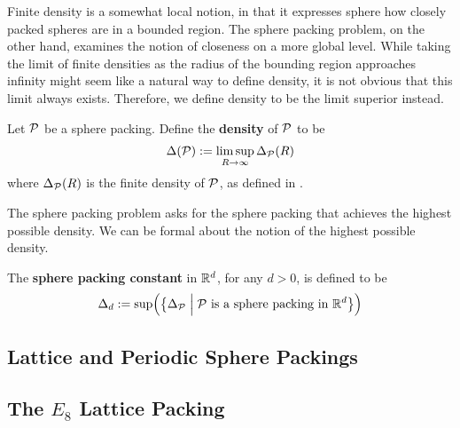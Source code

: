Finite density is a somewhat local notion, in that it expresses sphere how closely packed spheres are in a bounded region. The sphere packing problem, on the other hand, examines the notion of closeness on a more global level. While taking the limit of finite densities as the radius of the bounding region approaches infinity might seem like a natural way to define density, it is not obvious that this limit always exists. Therefore, we define density to be the limit superior instead.

\begin{boxdefinition}[Density]\label{Ch2:Def:Density}
    Let $\mathcal{P}$ be a sphere packing. Define the \textbf{density} of $\mathcal{P}$ to be
    \begin{align*}
        \Delta(\mathcal{P}) := \limsup_{R \to \infty} \Delta_{\mathcal{P}}(R)
    \end{align*}
    where $\Delta_{\mathcal{P}}(R)$ is the finite density of $\mathcal{P}$, as defined in .
\end{boxdefinition}

The sphere packing problem asks for the sphere packing that achieves the highest possible density. We can be formal about the notion of the highest possible density.

\begin{boxdefinition}
    The \textbf{sphere packing constant} in $\mathbb{R}^d$, for any $d > 0$, is defined to be
    \begin{align*}
        \Delta_d := \sup\!\left( {\left\{ \Delta_{\mathcal{P}} \; \middle\vert \; \mathcal{P} \text{ is a sphere packing in } \mathbb{R}^d \right\}} \right)
    \end{align*}
\end{boxdefinition}

\subsection{Lattice and Periodic Sphere Packings}

\subsection{The $E_8$ Lattice Packing}
